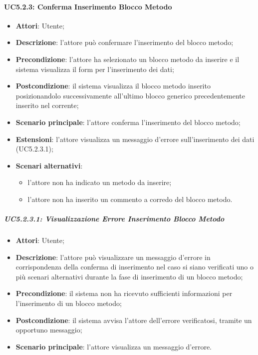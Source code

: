 \paragraph{UC5.2.3: Conferma Inserimento Blocco Metodo}
\label{UC5.2.3}
\begin{itemize}
	\item \textbf{Attori}: Utente;
	\item \textbf{Descrizione}: l'attore può confermare l'inserimento del blocco metodo;
	\item \textbf{Precondizione}: l'attore ha selezionato un blocco metodo da inserire e il sistema visualizza il form per l'inserimento dei dati;
	\item \textbf{Postcondizione}: il sistema visualizza il blocco metodo inserito posizionandolo successivamente all'ultimo blocco generico precedentemente inserito nel  corrente;	
	\item \textbf{Scenario principale}: l'attore conferma l'inserimento del blocco metodo;
	\item \textbf{Estensioni}: l'attore visualizza un messaggio d'errore sull'inserimento dei dati (UC5.2.3.1);
	\item \textbf{Scenari alternativi}:
	\begin{itemize}
		\item l'attore non ha indicato un metodo da inserire;
		\item l'attore non ha inserito un commento a corredo del blocco metodo.
	\end{itemize}
\end{itemize}

\subparagraph{UC5.2.3.1: Visualizzazione Errore Inserimento Blocco Metodo}
\label{UC5.2.3.1}
\begin{itemize}
	\item \textbf{Attori}: Utente;
	\item \textbf{Descrizione}: l'attore può visualizzare un messaggio d'errore in corrispondenza della conferma di inserimento nel caso si siano verificati uno o più scenari alternativi durante la fase di inserimento di un blocco metodo;
	\item \textbf{Precondizione}: il sistema non ha ricevuto sufficienti informazioni per l'inserimento di un blocco metodo;
	\item \textbf{Postcondizione}: il sistema avvisa l'attore dell'errore verificatosi, tramite un opportuno messaggio;
	\item \textbf{Scenario principale}: l'attore visualizza un messaggio d'errore.
\end{itemize}

